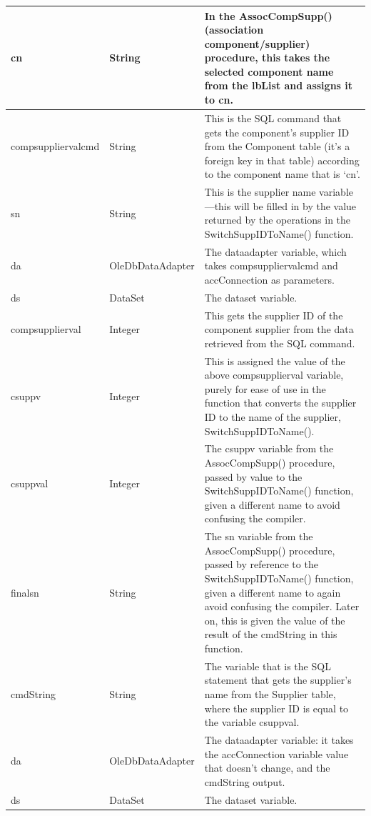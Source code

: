 \begin{longtable}{| p{4cm} | p{3cm} | p{10cm} |}
		\hline
		cn & String & In the AssocCompSupp() (association component\slash supplier) procedure, this takes the selected component name from the lbList and assigns it to cn.\\
		\hline
		compsuppliervalcmd & String & This is the SQL command that gets the component's supplier ID from the Component table (it's a foreign key in that table) according to the component name that is `cn'.\\
		\hline
		sn & String & This is the supplier name variable---this will be filled in by the value returned by the operations in the SwitchSuppIDToName() function.\\
		\hline
		da & OleDbDataAdapter & The dataadapter variable, which takes compsuppliervalcmd and accConnection as parameters.\\
		\hline
		ds & DataSet & The dataset variable.\\
		\hline
		compsupplierval & Integer & This gets the supplier ID of the component supplier from the data retrieved from the SQL command.\\
		\hline
		csuppv & Integer & This is assigned the value of the above compsupplierval variable, purely for ease of use in the function that converts the supplier ID to the name of the supplier, SwitchSuppIDToName().\\
		\hline
		csuppval & Integer & The csuppv variable from the AssocCompSupp() procedure, passed by value to the SwitchSuppIDToName() function, given a different name to avoid confusing the compiler.\\
		\hline
		finalsn & String & The sn variable from the AssocCompSupp() procedure, passed by reference to the SwitchSuppIDToName() function, given a different name to again avoid confusing the compiler.  Later on, this is given the value of the result of the cmdString in this function.\\
		\hline
		cmdString & String & The variable that is the SQL statement that gets the supplier's name from the Supplier table, where the supplier ID is equal to the variable csuppval.\\
		\hline
		da & OleDbDataAdapter & The dataadapter variable: it takes the accConnection variable value that doesn't change, and the cmdString output.\\
		\hline
		ds & DataSet & The dataset variable.\\
		\hline
	\end{longtable}
	
